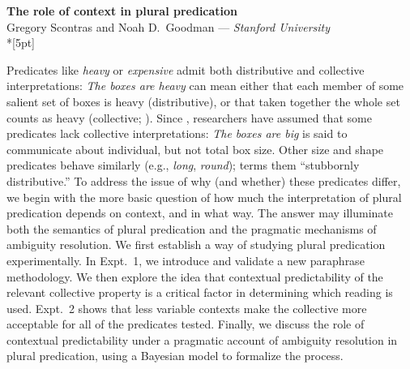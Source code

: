 \documentclass[12pt]{article}
\begin{document}
\begin{center}\textbf{The role of context in plural predication}\\
	Gregory Scontras and Noah D.\ Goodman --- \emph{Stanford University}\\*[5pt]
\end{center}

\vspace{-11pt}

\noindent Predicates like \textit{heavy} or \textit{expensive} admit both distributive and collective interpretations: \textit{The boxes are heavy} can mean either that each member of some salient set of boxes is heavy (distributive), or that taken together the whole set counts as heavy (collective; \citealp{scha1984}). Since \citet[p.140]{quine1960}, researchers have assumed that some predicates lack collective interpretations: \textit{The boxes are big} is said to communicate about individual, but not total box size. Other size and shape predicates behave similarly (e.g., \emph{long}, \emph{round}); \cite{schwarzschild2011} terms them ``stubbornly distributive.'' To address the issue of why (and whether) these predicates differ, we begin with the more basic question of how much the interpretation of plural predication depends on context, and in what way. The answer may illuminate both the semantics of plural predication and the pragmatic mechanisms of ambiguity resolution. We first establish a way of studying plural predication experimentally. In Expt.~1, we introduce and validate a new paraphrase methodology. We then explore the idea that contextual predictability of the relevant collective property is a critical factor in determining which reading is used. Expt.~2 shows that less variable contexts make the collective more acceptable for all of the predicates tested. Finally, we discuss the role of contextual predictability under a pragmatic account of ambiguity resolution in plural predication, using a Bayesian model to formalize the process.

\end{document}

